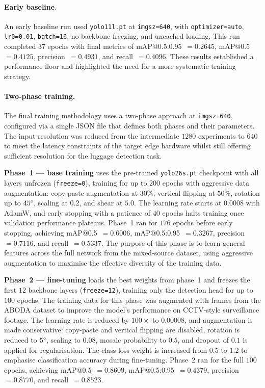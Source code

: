 \paragraph{Early baseline.}

An early baseline run used \texttt{yolo11l.pt} at \texttt{imgsz=640}, with
\texttt{optimizer=auto}, \texttt{lr0=0.01}, \texttt{batch=16}, no backbone
freezing, and uncached loading. This run completed $37$ epochs with final
metrics of mAP@0.5:0.95~$=0.2645$, mAP@0.5~$=0.4125$, precision~$=0.4931$, and
recall~$=0.4096$. These results established a performance floor and highlighted
the need for a more systematic training strategy.

\paragraph{Two-phase training.}

The final training methodology uses a two-phase approach at \texttt{imgsz=640},
configured via a single JSON file that defines both phases and their
parameters. The input resolution was reduced from the intermediate $1280$
experiments to $640$ to meet the latency constraints of the target edge
hardware whilst still offering sufficient resolution for the luggage detection
task.

\textbf{Phase~1 --- base training} uses the pre-trained \texttt{yolo26s.pt}
checkpoint with all layers unfrozen (\texttt{freeze=0}), training for up to
$200$ epochs with aggressive data augmentation: copy-paste augmentation at
$30\%$, vertical flipping at $50\%$, rotation up to $45\degree$, scaling at
$0.2$, and shear at $5.0$. The learning rate starts at $0.0008$ with AdamW,
and early stopping with a patience of $40$ epochs halts training once
validation performance plateaus. Phase~1 ran for $176$ epochs before early
stopping, achieving mAP@0.5~$=0.6006$, mAP@0.5:0.95~$=0.3267$,
precision~$=0.7116$, and recall~$=0.5337$. The purpose of this phase is to
learn general features across the full network from the mixed-source dataset,
using aggressive augmentation to maximise the effective diversity of the
training data.

\textbf{Phase~2 --- fine-tuning} loads the best weights from phase~1 and
freezes the first $12$ backbone layers (\texttt{freeze=12}), training only the
detection head for up to $100$ epochs. The training data for this phase was
augmented with frames from the ABODA dataset to improve the model's performance
on CCTV-style surveillance footage. The learning rate is reduced by
$100\times$ to $0.00008$, and augmentation is made conservative: copy-paste and
vertical flipping are disabled, rotation is reduced to $5\degree$, scaling to
$0.08$, mosaic probability to $0.5$, and dropout of $0.1$ is applied for
regularisation. The class loss weight is increased from $0.5$ to $1.2$ to
emphasise classification accuracy during fine-tuning. Phase~2 ran for the full
$100$ epochs, achieving mAP@0.5~$=0.8609$, mAP@0.5:0.95~$=0.4379$,
precision~$=0.8770$, and recall~$=0.8523$.


